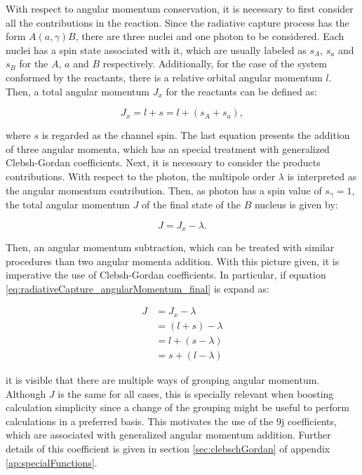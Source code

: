 \documentclass[openany]{book}
\begin{document}
With respect to angular momentum conservation, it is necessary to first consider all the contributions in the reaction. Since the radiative capture process has the form $A(a, \gamma)B$, there are three nuclei and one photon to be considered. Each nuclei has a spin state associated with it, which are usually labeled as $s_A$, $s_a$ and $s_B$ for the $A$, $a$ and $B$ respectively. Additionally, for the case of the system conformed by the reactants, there is a relative orbital angular momentum $l$. Then, a total angular momentum $J_x$ for the reactants can be defined as: 

\begin{equation}  \label{eq:radiativeCapture_angularMomentum_reactants}
	J_x = l + s = l + (s_A + s_a),
\end{equation}

where $s$ is regarded as the channel spin. The last equation presents the addition of three angular momenta, which has an special treatment with generalized Clebsh-Gordan coefficients. Next, it is necessary to consider the products contributions. With respect to the photon, the multipole order $\lambda$ is interpreted as the angular momentum contribution. Then, as photon has a spin value of $s_\gamma = 1$, the total angular momentum $J$ of the final state of the $B$ nucleus is given by: 

\begin{equation}  \label{eq:radiativeCapture_angularMomentum_final}
	J = J_x - \lambda.
\end{equation}

Then, an angular momentum subtraction, which can be treated with similar procedures than two angular momenta addition.  With this picture given, it is imperative the use of Clebsh-Gordan coefficients. In particular, if equation \ref{eq:radiativeCapture_angularMomentum_final} is expand as: 

\begin{equation}  \label{eq:radiativeCapture_angularMomentum_expanded}
	\begin{split}
		J  &= J_x - \lambda \\
			&= (l + s) - \lambda \\
			&= l + (s - \lambda) \\
			&= s + (l - \lambda)
	\end{split}
\end{equation}

it is visible that there are multiple ways of grouping angular momentum. Although $J$ is the same for all cases,  this is specially relevant when boosting calculation simplicity since a change of the grouping might be useful to perform calculations in a preferred basis. This motivates the use of the 9j coefficients, which are associated with generalized angular momentum addition. Further details of this coefficient is given in section \ref{sec:clebschGordan} of appendix \ref{ap:specialFunctions}. \\
\end{document}
